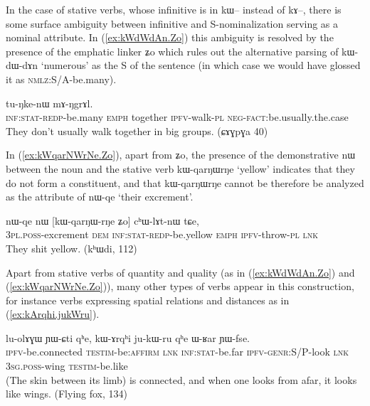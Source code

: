 \documentclass[oldfontcommands,oneside,a4paper,11pt]{article}
\newcommand{\ipa}[1]{{\phon \mbox{#1}}} %
\newcommand{\refb}[1]{(\ref{#1})}
\begin{document}
  In the case of stative verbs, whose infinitive is in \ipa{kɯ--} instead of \ipa{kɤ--}, there is some surface ambiguity between infinitive and S-nominalization serving as a nominal attribute. In \refb{ex:kWdWdAn.Zo}  this ambiguity is resolved by the presence of the emphatic linker \ipa{ʑo} which rules out the alternative parsing of \ipa{kɯ-dɯ-dɤn} `numerous' as the S of the sentence (in which case we would have glossed it as \textsc{nmlz}:S/A-be.many).
  
\begin{exe}
\ex \label{ex:kWdWdAn.Zo}
\gll
[\ipa{kɯ-dɯ-dɤn} 	\ipa{ʑo}] 	\ipa{tɯtɯrca} 	\ipa{tu-ŋke-nɯ} 	\ipa{mɤ-ŋgrɤl.} \\
\textsc{inf:stat-redp}-be.many \textsc{emph} together \textsc{ipfv}-walk-\textsc{pl} \textsc{neg-fact}:be.usually.the.case \\
\glt They don't usually walk together in big groups. (ɕɤɣpɣa 40)
\end{exe}

In \refb{ex:kWqarNWrNe.Zo}, apart from \ipa{ʑo}, the presence of the demonstrative   \ipa{nɯ} between the noun  and the stative verb 	\ipa{kɯ-qarŋɯrŋe} `yellow' indicates that  they do not form a constituent, and that 	\ipa{kɯ-qarŋɯrŋe} cannot be therefore be analyzed as the attribute of  \ipa{nɯ-qe} `their excrement'.

\begin{exe}
\ex \label{ex:kWqarNWrNe.Zo}
\gll
\ipa{nɯ-qe} 	\ipa{nɯ} 	[\ipa{kɯ-qarŋɯ-rŋe} 	\ipa{ʑo}] 	\ipa{cʰɯ-lɤt-nɯ} 	\ipa{tɕe,} \\
\textsc{3pl.poss}-excrement \textsc{dem} \textsc{inf:stat-redp}-be.yellow \textsc{emph}  \textsc{ipfv}-throw-\textsc{pl} \textsc{lnk} \\
\glt They shit yellow. (kʰɯdi, 112)
\end{exe}


Apart from stative  verbs of quantity and quality   (as in \refb{ex:kWdWdAn.Zo} and \refb{ex:kWqarNWrNe.Zo}), many other types of verbs appear in this construction, for instance verbs expressing spatial relations and distances as in \refb{ex:kArqhi.jukWru}.

\begin{exe}
\ex \label{ex:kArqhi.jukWru}
\gll
\ipa{lu-olɤɣɯ} 	\ipa{ɲɯ-ɕti} 	\ipa{qʰe,} 	\ipa{kɯ-ɤrqʰi} 	\ipa{ju-kɯ-ru} 	\ipa{qʰe} 	\ipa{ɯ-ʁar} 	\ipa{ɲɯ-fse.}\\
\textsc{ipfv}-be.connected \textsc{testim}-be:\textsc{affirm} \textsc{lnk} \textsc{inf:stat}-be.far \textsc{ipfv-genr}:S/P-look \textsc{lnk} \textsc{3sg.poss}-wing \textsc{testim}-be.like\\
\glt (The skin between its limb) is connected, and when one looks from afar, it looks like wings. (Flying fox, 134)
\end{exe}
\end{document}
